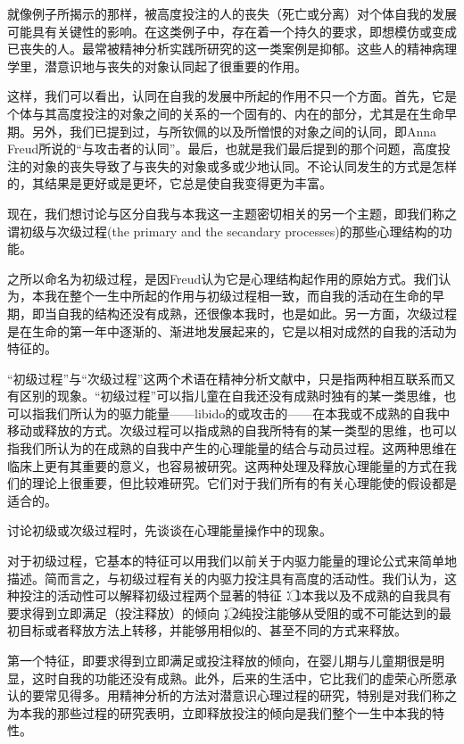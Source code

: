 \documentclass[UTF8,10pt,a4paper,openany]{book}
\newcommand{\quan}[1]{\textcircled{\small #1}}
\begin{document}
就像例子所揭示的那样，被高度投注的人的丧失（死亡或分离）对个体自我的发展可能具有关键性的影响。在这类例子中，存在着一个持久的要求，即想模仿或变成已丧失的人。最常被精神分析实践所研究的这一类案例是抑郁。这些人的精神病理学里，潜意识地与丧失的对象认同起了很重要的作用。

这样，我们可以看出，认同在自我的发展中所起的作用不只一个方面。首先，它是个体与其高度投注的对象之间的关系的一个固有的、内在的部分，尤其是在生命早期。另外，我们已提到过，与所钦佩的以及所憎恨的对象之间的认同，即Anna Freud所说的“与攻击者的认同”。最后，也就是我们最后提到的那个问题，高度投注的对象的丧失导致了与丧失的对象或多或少地认同。不论认同发生的方式是怎样的，其结果是更好或是更坏，它总是使自我变得更为丰富。

现在，我们想讨论与区分自我与本我这一主题密切相关的另一个主题，即我们称之谓初级与次级过程(the primary and the secandary processes)的那些心理结构的功能。

之所以命名为初级过程，是因Freud认为它是心理结构起作用的原始方式。我们认为，本我在整个一生中所起的作用与初级过程相一致，而自我的活动在生命的早期，即当自我的结构还没有成熟，还很像本我时，也是如此。另一方面，次级过程是在生命的第一年中逐渐的、渐进地发展起来的，它是以相对成然的自我的活动为特征的。

“初级过程”与“次级过程”这两个术语在精神分析文献中，只是指两种相互联系而又有区别的现象。“初级过程”可以指儿童在自我还没有成熟时独有的某一类思维，也可以指我们所认为的驱力能量——libido的或攻击的——在本我或不成熟的自我中移动或释放的方式。次级过程可以指成熟的自我所特有的某一类型的思维，也可以指我们所认为的在成熟的自我中产生的心理能量的结合与动员过程。这两种思维在临床上更有其重要的意义，也容易被研究。这两种处理及释放心理能量的方式在我们的理论上很重要，但比较难研究。它们对于我们所有的有关心理能使的假设都是适合的。

讨论初级或次级过程时，先谈谈在心理能量操作中的现象。

对于初级过程，它基本的特征可以用我们以前关于内驱力能量的理论公式来简单地描述。简而言之，与初级过程有关的内驱力投注具有高度的活动性。我们认为，这种投注的活动性可以解释初级过程两个显著的特征：\quan{1}本我以及不成熟的自我具有要求得到立即满足（投注释放）的倾向；\quan{2}纯投注能够从受阻的或不可能达到的最初目标或者释放方法上转移，并能够用相似的、甚至不同的方式来释放。

第一个特征，即要求得到立即满足或投注释放的倾向，在婴儿期与儿童期很是明显，这时自我的功能还没有成熟。此外，后来的生活中，它比我们的虚荣心所愿承认的要常见得多。用精神分析的方法对潜意识心理过程的研究，特别是对我们称之为本我的那些过程的研究表明，立即释放投注的倾向是我们整个一生中本我的特性。
\end{document}

